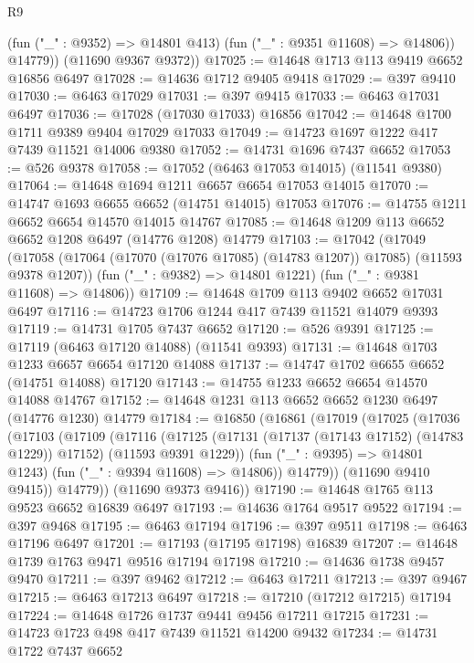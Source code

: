 \begin{lexlean}{R9}
\begin{coremodule}
            (fun ("_" : @9352) => @14801 @413)
            (fun ("_" : @9351 @11608) => @14806))
          @14779))
      (@11690 @9367 @9372))
@17025 := @14648 @1713 @113 @9419 @6652 @16856 @6497
@17028 := @14636 @1712 @9405 @9418
@17029 := @397 @9410
@17030 := @6463 @17029
@17031 := @397 @9415
@17033 := @6463 @17031 @6497
@17036 := @17028 (@17030 @17033) @16856
@17042 := @14648 @1700 @1711 @9389 @9404 @17029 @17033
@17049 := @14723 @1697 @1222 @417 @7439 @11521 @14006 @9380
@17052 := @14731 @1696 @7437 @6652
@17053 := @526 @9378
@17058 := @17052 (@6463 @17053 @14015) (@11541 @9380)
@17064 := @14648 @1694 @1211 @6657 @6654 @17053 @14015
@17070 := @14747 @1693 @6655 @6652 (@14751 @14015) @17053
@17076 := @14755 @1211 @6652 @6654 @14570 @14015 @14767
@17085 := @14648 @1209 @113 @6652 @6652 @1208 @6497 (@14776 @1208) @14779
@17103 := @17042
    (@17049
      (@17058 (@17064 (@17070 (@17076 @17085) (@14783 @1207)) @17085) (@11593 @9378 @1207))
      (fun ("_" : @9382) => @14801 @1221)
      (fun ("_" : @9381 @11608) => @14806))
@17109 := @14648 @1709 @113 @9402 @6652 @17031 @6497
@17116 := @14723 @1706 @1244 @417 @7439 @11521 @14079 @9393
@17119 := @14731 @1705 @7437 @6652
@17120 := @526 @9391
@17125 := @17119 (@6463 @17120 @14088) (@11541 @9393)
@17131 := @14648 @1703 @1233 @6657 @6654 @17120 @14088
@17137 := @14747 @1702 @6655 @6652 (@14751 @14088) @17120
@17143 := @14755 @1233 @6652 @6654 @14570 @14088 @14767
@17152 := @14648 @1231 @113 @6652 @6652 @1230 @6497 (@14776 @1230) @14779
@17184 := @16850
    (@16861
      (@17019
        (@17025
          (@17036
            (@17103
              (@17109
                (@17116
                  (@17125
                    (@17131 (@17137 (@17143 @17152) (@14783 @1229)) @17152)
                    (@11593 @9391 @1229))
                  (fun ("_" : @9395) => @14801 @1243)
                  (fun ("_" : @9394 @11608) => @14806))
                @14779))
            (@11690 @9410 @9415))
          @14779))
      (@11690 @9373 @9416))
@17190 := @14648 @1765 @113 @9523 @6652 @16839 @6497
@17193 := @14636 @1764 @9517 @9522
@17194 := @397 @9468
@17195 := @6463 @17194
@17196 := @397 @9511
@17198 := @6463 @17196 @6497
@17201 := @17193 (@17195 @17198) @16839
@17207 := @14648 @1739 @1763 @9471 @9516 @17194 @17198
@17210 := @14636 @1738 @9457 @9470
@17211 := @397 @9462
@17212 := @6463 @17211
@17213 := @397 @9467
@17215 := @6463 @17213 @6497
@17218 := @17210 (@17212 @17215) @17194
@17224 := @14648 @1726 @1737 @9441 @9456 @17211 @17215
@17231 := @14723 @1723 @498 @417 @7439 @11521 @14200 @9432
@17234 := @14731 @1722 @7437 @6652

\end{coremodule}
\end{lexlean}
